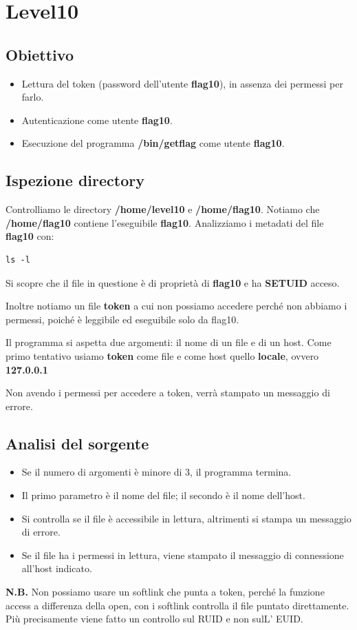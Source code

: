 \section{Level10}
\subsection{Obiettivo}
\begin{itemize}
    \item Lettura del token (password dell’utente \textbf{flag10}), in assenza dei permessi per farlo.
    \item Autenticazione come utente \textbf{flag10}.
    \item Esecuzione del programma \textbf{/bin/getflag} come utente \textbf{flag10}.
\end{itemize}

\subsection{Ispezione directory}
Controlliamo le directory \textbf{/home/level10} e \textbf{/home/flag10}. Notiamo che \textbf{/home/flag10} contiene l’eseguibile \textbf{flag10}.
Analizziamo i metadati del file \textbf{flag10} con: 
\begin{lstlisting}[style=bashstyle]
    ls -l
\end{lstlisting}
Si scopre che il file in questione è di proprietà di \textbf{flag10} e ha \textbf{SETUID} acceso.

Inoltre notiamo un file \textbf{token} a cui non possiamo accedere perché non abbiamo i permessi, poiché è leggibile ed eseguibile solo da flag10.

Il programma si aspetta due argomenti: il nome di un file e di un host. Come primo tentativo usiamo \textbf{token} come file e come host quello \textbf{locale}, ovvero \textbf{127.0.0.1}

Non avendo i permessi per accedere a token, verrà stampato un messaggio di errore.

\subsection{Analisi del sorgente}
\begin{itemize}
    \item Se il numero di argomenti è minore di 3, il programma termina.
    \item Il primo parametro è il nome del file; il secondo è il nome dell'host.
    \item Si controlla se il file è accessibile in lettura, altrimenti si stampa un messaggio di errore.
    \item Se il file ha i permessi in lettura, viene stampato il messaggio di connessione all'host indicato.
\end{itemize}
\textbf{N.B.} Non possiamo usare un softlink che punta a token, perché la funzione access a differenza della open, con i softlink controlla il file puntato direttamente. Più precisamente viene fatto un controllo sul RUID e non sulL' EUID.

